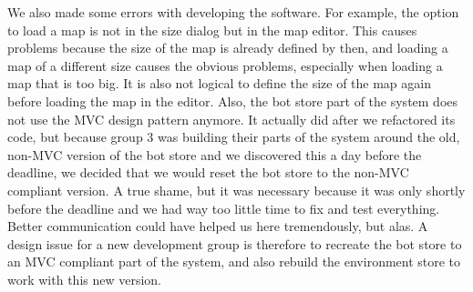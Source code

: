 \documentclass[]{article}
\begin{document}
We also made some errors with developing the software. For example, the option to load a map is not in the size dialog but in the map editor. This causes problems because the size of the map is already defined by then, and loading a map of a different size causes the obvious problems, especially when loading a map that is too big. It is also not logical to define the size of the map again before loading the map in the editor. Also, the bot store part of the system does not use the MVC design pattern anymore. It actually did after we refactored its code, but because group 3 was building their parts of the system around the old, non-MVC version of the bot store and we discovered this a day before the deadline, we decided that we would reset the bot store to the non-MVC compliant version. A true shame, but it was necessary because it was only shortly before the deadline and we had way too little time to fix and test everything. Better communication could have helped us here tremendously, but alas. A design issue for a new development group is therefore to recreate the bot store to an MVC compliant part of the system, and also rebuild the environment store to work with this new version.
\end{document}
